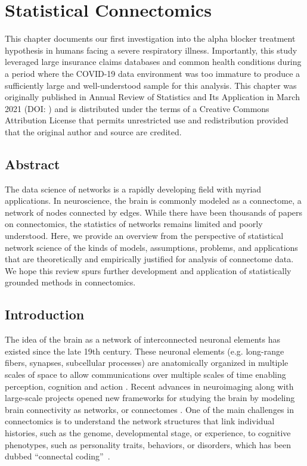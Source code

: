 \chapter{Statistical Connectomics} \label{chap:chap-3}

This chapter documents our first investigation into the alpha blocker treatment hypothesis in humans facing a severe respiratory illness. Importantly, this study leveraged large insurance claims databases and common health conditions during a period where the COVID-19 data environment was too immature to produce a sufficiently large and well-understood sample for this analysis. This chapter was originally published in Annual Review of Statistics and Its Application in March 2021 (DOI: ) and is distributed under the terms of a Creative Commons Attribution License that permits unrestricted use and redistribution provided that the original author and source are credited.

\pagebreak
\section*{Abstract}
The data science of networks is a rapidly developing field with myriad applications.  In neuroscience, the brain is commonly modeled as a connectome, a network of nodes connected by edges. While there have been thousands of papers on connectomics, the statistics of networks remains limited and poorly understood.  Here, we provide an overview from the perspective of statistical network science of the kinds of models, assumptions, problems, and applications that are theoretically and empirically justified for analysis of connectome data.  We hope this review spurs further development and application of statistically grounded methods in connectomics.
\pagebreak

\section{Introduction}
The idea of the brain as a network of interconnected neuronal elements has existed since the late 19th century. These neuronal elements (e.g. long-range fibers, synapses, subcellular processes) are anatomically organized in multiple scales of space to allow communications over multiple scales of time enabling perception, cognition and action \citep{Shepherd1991-ri,Rieke1997-ok,Russell2016-gt}. Recent advances in neuroimaging \citep{Chung2013-zb,Hagmann2005,Biswal2010-hk} along with large-scale projects opened new frameworks for studying the brain by modeling  brain connectivity as networks, or connectomes \citep{hcp1,zuo2014open,alexander2017open}. One of the main challenges in connectomics is to understand the network structures that link individual histories, such as the genome, developmental stage, or experience, to cognitive phenotypes, such as personality traits, behaviors, or disorders, which has been dubbed ``connectal coding''~\cite{vogelstein2019connectal}.

